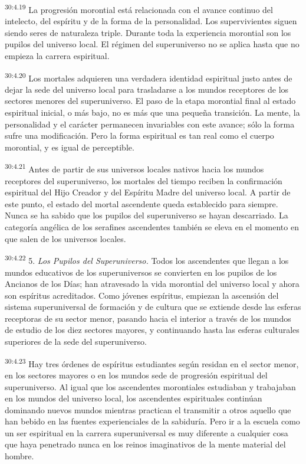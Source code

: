 \par
\textsuperscript{30:4.19} La progresión morontial está relacionada con el avance continuo del intelecto, del espíritu y de la forma de la personalidad. Los supervivientes siguen siendo seres de naturaleza triple. Durante toda la experiencia morontial son los pupilos del universo local. El régimen del superuniverso no se aplica hasta que no empieza la carrera espiritual.

\par
\textsuperscript{30:4.20} Los mortales adquieren una verdadera identidad espiritual justo antes de dejar la sede del universo local para trasladarse a los mundos receptores de los sectores menores del superuniverso. El paso de la etapa morontial final al estado espiritual inicial, o más bajo, no es más que una pequeña transición. La mente, la personalidad y el carácter permanecen invariables con este avance; sólo la forma sufre una modificación. Pero la forma espiritual es tan real como el cuerpo morontial, y es igual de perceptible.

\par
\textsuperscript{30:4.21} Antes de partir de sus universos locales nativos hacia los mundos receptores del superuniverso, los mortales del tiempo reciben la confirmación espiritual del Hijo Creador y del Espíritu Madre del universo local. A partir de este punto, el estado del mortal ascendente queda establecido para siempre. Nunca se ha sabido que los pupilos del superuniverso se hayan descarriado. La categoría angélica de los serafines ascendentes también se eleva en el momento en que salen de los universos locales.

\par
\textsuperscript{30:4.22} 5. \textit{Los Pupilos del Superuniverso.} Todos los ascendentes que llegan a los mundos educativos de los superuniversos se convierten en los pupilos de los Ancianos de los Días; han atravesado la vida morontial del universo local y ahora son espíritus acreditados. Como jóvenes espíritus, empiezan la ascensión del sistema superuniversal de formación y de cultura que se extiende desde las esferas receptoras de su sector menor, pasando hacia el interior a través de los mundos de estudio de los diez sectores mayores, y continuando hasta las esferas culturales superiores de la sede del superuniverso.

\par
\textsuperscript{30:4.23} Hay tres órdenes de espíritus estudiantes según residan en el sector menor, en los sectores mayores o en los mundos sede de progresión espiritual del superuniverso. Al igual que los ascendentes morontiales estudiaban y trabajaban en los mundos del universo local, los ascendentes espirituales continúan dominando nuevos mundos mientras practican el transmitir a otros aquello que han bebido en las fuentes experienciales de la sabiduría. Pero ir a la escuela como un ser espiritual en la carrera superuniversal es muy diferente a cualquier cosa que haya penetrado nunca en los reinos imaginativos de la mente material del hombre.


